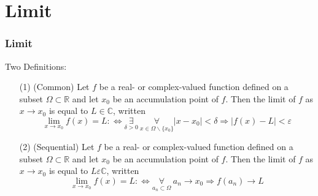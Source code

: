 \documentclass{beamer}
\begin{document}
\section{Limit}
\begin{frame}
    \frametitle{Limit}
    Two Definitions:
    \begin{itemize}
        \item[(1)] (Common) Let $f$ be a real- or complex-valued function defined on a subset $\Omega\subset \mathbb{R}$ 
        and let $x_0$ be an accumulation point of $f$. Then the limit of $f$ as $x\to x_0$ is equal to $L \in \mathbb{C}$, written 
        $$\underset{x\to x_0}{\lim} ⁡f(x) = L :\Leftrightarrow\underset{\delta>0}{\exists}~\underset{x\in \Omega\backslash\{x_0\}}{\forall} |x-x_0|<\delta\Rightarrow|f(x)-L|<\varepsilon$$
        \item[(2)] (Sequential) Let $f$ be a real- or complex-valued function defined on a subset $\Omega\subset \mathbb{R}$ 
        and let $x_0$ be an accumulation point of $f$. Then the limit of $f$ as $x\to x_0$ is equal to $𝐿 \varepsilon \mathbb{C}$, written 
        $$\underset{x\to x_0}{\lim} ⁡f(x) = L :\Leftrightarrow\underset{a_n\subset \Omega}{\forall}~a_n\to x_0 \Rightarrow f(a_n)\to L$$
    \end{itemize} 
\end{frame}
\end{document}
